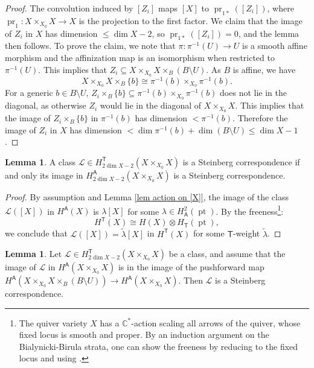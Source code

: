 \documentclass[10pt]{amsart}
\theoremstyle{definition}
\newtheorem{Lemma}[Theorem]{Lemma}
\numberwithin{equation}{section}
\newcommand{\C}{\mathbb{C}}
\newcommand{\sA}{\mathsf{A}}
\newcommand{\sT}{\mathsf{T}}
\newcommand{\pr}{\operatorname{pr}}
\newcommand{\pt}{\operatorname{pt}}
\begin{document}
\begin{proof}
The convolution induced by $[Z_i]$ maps $[X]$ to $\pr_{1*}([Z_i])$, where $\pr_1\colon X\times_{X_0}X\to X$ is the projection to the first factor. We claim that the image of $Z_i$ in $X$ has dimension $\leqslant \dim X-2$, so $\pr_{1*}([Z_i])=0$, and the lemma then follows.
To prove the claim, we note that $\pi\colon \pi^{-1}(U)\to U$ is a smooth affine morphism and the affinization map is an isomorphism when restricted to $\pi^{-1}(U)$. This implies that $Z_i\subseteq X\times_{X_0} X\times_B (B\setminus U)$. As $B$ is affine, we have $$X\times_{X_0} X\times_B \{b\}\cong \pi^{-1}(b)\times_{X_0} \pi^{-1}(b). $$ 
For a generic $b\in B\setminus U$, $Z_i\times_{B}\{b\}\subseteq \pi^{-1}(b)\times_{X_0}\pi^{-1}(b)$ does not lie in the diagonal, as otherwise $Z_i$ would lie in the diagonal of $X\times_{X_0}X$. This implies that the image of $Z_i\times_{B}\{b\}$ in $\pi^{-1}(b)$ has dimension
$<\pi^{-1}(b)$. Therefore the image of $Z_i$ in $X$ has 
dimension $<\dim \pi^{-1}(b)+\dim(B\setminus U)\leqslant\dim X-1$.
\end{proof}

\begin{Lemma}\label{lem image in H^A}
A class $\mathcal L\in H^{\sT}_{2\dim X-2}(X\times_{X_0}X)$ is a Steinberg correspondence if and only its image in $H^{\sA}_{2\dim X-2}(X\times_{X_0}X)$ is a Steinberg correspondence.
\end{Lemma}

\begin{proof}
By assumption and Lemma \ref{lem action on [X]}, the image of the class $\mathcal L([X])$ in $H^\sA(X)$ is $\lambda[X]$ for some $\lambda\in H^2_\sA(\pt)$. By the freeness\footnote{The quiver variety $X$ has a $\C^*$-action scaling all arrows of the quiver, whose fixed locus is smooth and proper. By an induction argument on the Bialynicki-Birula strata, one can show the freeness by reducing to the fixed locus and using \cite[Thm.~ A.1.10]{Zhu}.}:
$$H^\sT(X)\cong H(X)\otimes H_\sT(\pt),$$ we conclude that $\mathcal L([X])=\tilde\lambda[X]$ in $H^\sT(X)$ for some $\sT$-weight $\tilde\lambda$.
\end{proof}


\begin{Lemma}\label{lem away from affine locus}
Let $\mathcal L\in H^{\sT}_{2\dim X-2}(X\times_{X_0}X)$ be a class, and assume that the image of $\mathcal L$ in $H^{\sA}(X\times_{X_0}X)$ is in the image of the pushforward map $H^{\sA}(X\times_{X_0}X\times_B(B\setminus U))\to H^{\sA}(X\times_{X_0}X)$. Then $\mathcal L$ is a Steinberg correspondence.
\end{Lemma}
\end{document}
